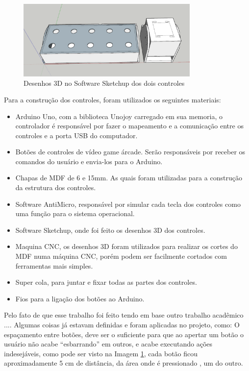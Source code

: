 \documentclass[
	12pt,			%
	openright,		%
	oneside,			%
	a4paper,			%
	chapter=TITLE,		%
	english,			%
	brazil,			%
	]{abntex2}
\begin{document}
\begin{figure}[H]
	\centering
		\includegraphics[width=0.8\textwidth]{./img/img-17.png}
		\caption{Desenhos 3D no Software Sketchup dos dois controles}
		\label{img:img-17}
\end{figure}


Para a construção dos controles, foram utilizados os seguintes materiais:
\begin{itemize}
\item Arduino Uno, com a biblioteca Unojoy carregado em sua memoria, o controlador é responsável por fazer o mapeamento e a comunicação entre os controles e a porta USB do computador.
\item Botões de controles de vídeo game árcade. Serão responsáveis por receber os comandos do usuário e envia-los para o Arduino.
\item Chapas de MDF de 6 e 15mm. As quais foram utilizadas para a construção da estrutura dos controles.
\item Software AntiMicro, responsável por simular cada tecla dos controles como uma função para o sistema operacional.
\item Software Sketchup, onde foi feito os desenhos 3D dos controles.
\item Maquina CNC, os desenhos 3D foram utilizados para realizar os cortes do MDF numa máquina CNC, porém podem ser facilmente cortados com ferramentas mais simples.
\item Super cola, para juntar e fixar todas as partes dos controles.
\item Fios para a ligação dos botões ao Arduino.
\end{itemize}

Pelo fato de que esse trabalho foi feito tendo em base outro trabalho acadêmico .... Algumas coisas já estavam definidas e foram aplicadas no projeto, como: 
O espaçamento entre botões, deve ser o suficiente para que ao apertar um botão o usuário não acabe “esbarrando” em outros, e acabe executando ações indesejáveis, como pode ser visto na Imagem \ref{img:img-17}, cada botão ficou aproximadamente 5 cm de distância, da área onde é pressionado , um do outro.
\end{document}
